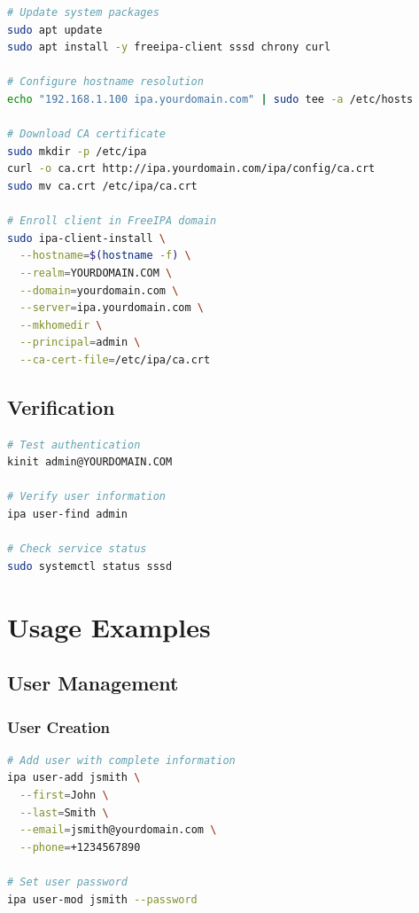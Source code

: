 \documentclass[12pt,a4paper]{report}
\begin{document}
\begin{lstlisting}[language=bash,caption=Linux Client Enrollment]
# Update system packages
sudo apt update
sudo apt install -y freeipa-client sssd chrony curl

# Configure hostname resolution
echo "192.168.1.100 ipa.yourdomain.com" | sudo tee -a /etc/hosts

# Download CA certificate
sudo mkdir -p /etc/ipa
curl -o ca.crt http://ipa.yourdomain.com/ipa/config/ca.crt
sudo mv ca.crt /etc/ipa/ca.crt

# Enroll client in FreeIPA domain
sudo ipa-client-install \
  --hostname=$(hostname -f) \
  --realm=YOURDOMAIN.COM \
  --domain=yourdomain.com \
  --server=ipa.yourdomain.com \
  --mkhomedir \
  --principal=admin \
  --ca-cert-file=/etc/ipa/ca.crt
\end{lstlisting}

\section{Verification}

\begin{lstlisting}[language=bash,caption=Verify Client Enrollment]
# Test authentication
kinit admin@YOURDOMAIN.COM

# Verify user information
ipa user-find admin

# Check service status
sudo systemctl status sssd
\end{lstlisting}

\chapter{Usage Examples}

\section{User Management}

\subsection{User Creation}

\begin{lstlisting}[language=bash,caption=Create New User]
# Add user with complete information
ipa user-add jsmith \
  --first=John \
  --last=Smith \
  --email=jsmith@yourdomain.com \
  --phone=+1234567890

# Set user password
ipa user-mod jsmith --password
\end{lstlisting}
\end{document}

